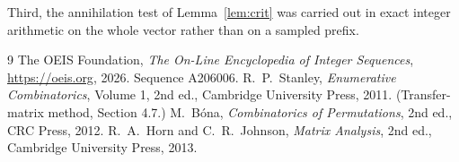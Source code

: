 \documentclass[11pt,a4paper]{article}
\theoremstyle{plain}
\theoremstyle{definition}
\begin{document}
Third, the annihilation test of Lemma~\ref{lem:crit} was carried out in exact integer
arithmetic on the whole vector rather than on a sampled prefix.

\begin{thebibliography}{9}
 The OEIS Foundation, \emph{The On-Line Encyclopedia of Integer
Sequences}, \url{https://oeis.org}, 2026. Sequence A206006.
 R.~P.~Stanley, \emph{Enumerative Combinatorics}, Volume 1, 2nd ed.,
Cambridge University Press, 2011. (Transfer-matrix method, Section 4.7.)
 M.~B\'ona, \emph{Combinatorics of Permutations}, 2nd ed., CRC
Press, 2012.
 R.~A.~Horn and C.~R.~Johnson, \emph{Matrix Analysis}, 2nd ed., Cambridge
University Press, 2013.
\end{thebibliography}
\end{document}
